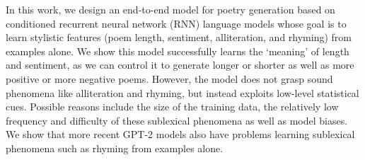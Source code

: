 In this work, we design an end-to-end model for poetry generation based on conditioned recurrent neural network (RNN) language models whose goal is to learn stylistic features (poem length, sentiment, alliteration, and rhyming) from examples alone. We show this model successfully learns the `meaning' of length and sentiment, as we can control it to generate longer or shorter as well as more positive or more negative poems. However, the model does not grasp sound phenomena like alliteration and rhyming, but instead exploits low-level statistical cues. Possible reasons include the size of the training data, the relatively low frequency and difficulty of these sublexical phenomena as well as model biases. We show that more recent GPT-2 models also have problems learning sublexical phenomena such as rhyming from examples alone.
